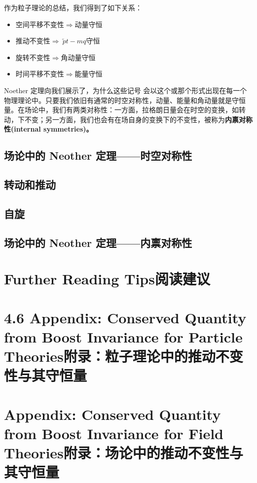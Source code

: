 作为粒子理论的总结，我们得到了如下关系：
\begin{itemize}
\item 空间平移不变性$\Rightarrow$动量守恒
\item 推动不变性$\Rightarrow~\tilde{p}t-mq$守恒
\item 旋转不变性$\Rightarrow$角动量守恒
\item 时间平移不变性$\Rightarrow$能量守恒
\end{itemize}
Noether 定理向我们展示了，为什么这些记号%
%
会以这个或那个形式出现在每一个物理理论中。只要我们依旧有通常的时空对称性，动量、能量和角动量就是守恒量。在场论中，我们有两类对称性：一方面，拉格朗日量会在时空的变换，如转动，下不变；另一方面，我们也会有在场自身的变换下的不变性，被称为{\bf 内禀对称性(internal symmetries)。}

\subsection{场论中的 Neother 定理——时空对称性}\label{sec4.5.2}

\subsection{转动和推动}\label{sec4.5.3}

\subsection{自旋}\label{sec4.5.4}

\subsection{场论中的 Neother 定理——内禀对称性}\label{sec4.5.5}

\section*{Further Reading Tips\quad 阅读建议}

\section[附录：粒子理论中的推动不变性与其守恒量]{4.6 Appendix: Conserved Quantity from Boost
Invariance for Particle Theories\quad 附录：粒子理论中的推动不变性与其守恒量}\label{sec4.6}

\section[附录：场论中的推动不变性与其守恒量]{Appendix: Conserved Quantity from Boost
Invariance for Field Theories\quad 附录：场论中的推动不变性与其守恒量}\label{sec4.7}